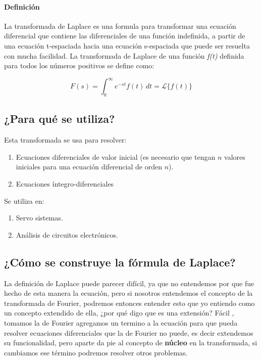 \paragraph*{Definición}
La transformada de Laplace es una formula para transformar una ecuación
diferencial que contiene las diferenciales de una función indefinida, a partir de una
ecuación t-espaciada hacia una ecuación s-espaciada que puede ser resuelta con mucha facilidad.	
\newline
La transformada de Laplace de una función \textit{f(t)} definida para todos los números positivos se define como:

\[
F(s) = \int_{0}^{\infty} \! e^{-st} f(t)  \,dt = \mathscr{L}\{f(t)\}
\]

\subsection{¿Para qué se utiliza?}
\noindent Esta transformada se usa para resolver:
 \begin{enumerate}
	\item Ecuaciones diferenciales de valor inicial (es necesario que tengan $n$ valores iniciales para una ecuación diferencial de orden $n$).
	\item Ecuaciones íntegro-diferenciales
\end{enumerate}

\noindent Se utiliza en:

\begin{enumerate}
	\item Servo sistemas.
	\item Análisis de circuitos electrónicos.
\end{enumerate}

\subsection{¿Cómo se construye la fórmula de Laplace?}


La definición de Laplace puede parecer difícil, ya que  no entendemos por que fue hecho de esta manera la ecuación, pero si nosotros entendemos el concepto de la transformada de Fourier, podremos entonces entender esto que yo entiendo como un concepto extendido de ella, ¿por qué digo que es una extensión? Fácil , tomamos la de Fourier  agregamos un termino a la ecuación para que pueda resolver ecuaciones diferenciales que la de Fourier no puede, es decir extendemos su funcionalidad, pero aparte da pie al concepto de \textbf{núcleo} en la transformada, si cambiamos ese término podremos resolver otros problemas.

